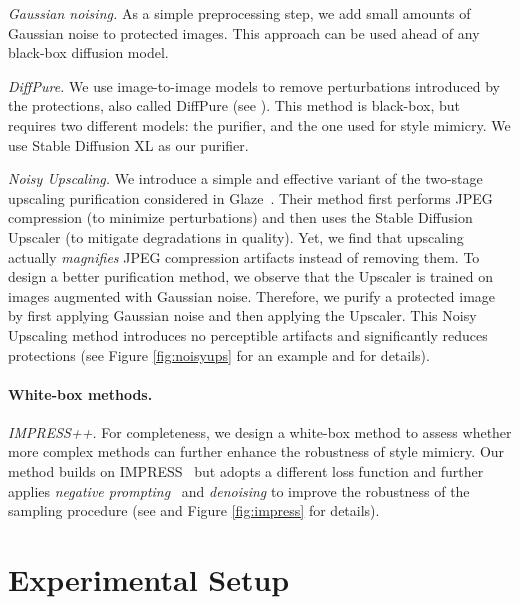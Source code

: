 \documentclass{article}
\begin{document}
\noindent {} \emph{Gaussian noising.} As a simple preprocessing step, we add small amounts of Gaussian noise to protected images. This approach can be used ahead of any black-box diffusion model.

\noindent {} \emph{DiffPure.} We use image-to-image models to remove perturbations introduced by the protections, also called DiffPure \citep{diffpure} (see ). This method is black-box, but requires two different models: the purifier, and the one used for style mimicry. We use Stable Diffusion XL as our purifier.

    \noindent {} \emph{Noisy Upscaling.} We introduce a simple and effective variant of the two-stage upscaling purification considered in Glaze~\citep{glaze}. Their method first performs JPEG compression (to minimize perturbations) and then uses the Stable Diffusion Upscaler \citep{stablediffusion} (to mitigate degradations in quality). 
    Yet, we find that upscaling actually \emph{magnifies} JPEG compression artifacts instead of removing them. To design a better purification method, we observe that the Upscaler is trained on images augmented with Gaussian noise.  Therefore, we purify a protected image by first applying Gaussian noise and then applying the Upscaler. This Noisy Upscaling method introduces no perceptible artifacts and significantly reduces protections (see Figure \ref{fig:noisyups} for an example and  for details).

\paragraph{White-box methods.}\hspace{0.3em}

\noindent {} \emph{IMPRESS++.} For completeness, we design a white-box method to assess whether more complex methods can further enhance the robustness of style mimicry. Our method builds on IMPRESS~\citep{impress} but adopts a different loss function and further applies \emph{negative prompting}~\citep{miyake2023negative} and \emph{denoising} to improve the robustness of the sampling procedure (see  and Figure \ref{fig:impress} for details).






\section{Experimental Setup}
\label{sec:experimentalsetup}
\end{document}
